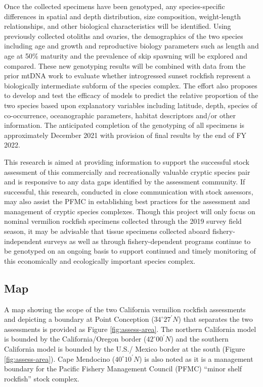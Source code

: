 \documentclass[
  english,
  a4paper,
]{article}
\begin{document}
Once the collected specimens have been genotyped, any species-specific differences
in spatial and depth distribution, size composition, weight-length relationships,
and other biological characteristics will be identified. Using previously
collected otoliths and ovaries, the demographics of the two species including
age and growth and reproductive biology parameters such as length and age at
50\% maturity and the prevalence of skip spawning will be explored and compared.
These new genotyping results will be combined with data from the prior mtDNA
work to evaluate whether introgressed sunset rockfish represent a biologically
intermediate subform of the species complex. The effort also proposes to develop
and test the efficacy of models to predict the relative proportion of the two
species based upon explanatory variables including latitude, depth, species of
co-occurrence, oceanographic parameters, habitat descriptors and/or other
information. The anticipated completion of the genotyping of all specimens
is approximately December 2021 with provision of final results by the end of FY 2022.

This research is aimed at providing information to support the successful stock
assessment of this commercially and recreationally valuable cryptic species pair
and is responsive to any data gaps identified by the assessment community. If
successful, this research, conducted in close communication with stock assessors,
may also assist the PFMC in establishing best practices for the assessment and
management of cryptic species complexes. Though this project will only focus
on nominal vermilion rockfish specimens collected through the 2019 survey
field season, it may be advisable that tissue specimens collected aboard
fishery-independent surveys as well as through fishery-dependent programs
continue to be genotyped on an ongoing basis to support continued and timely
monitoring of this economically and ecologically important species complex.

\hypertarget{map}{%
\subsection{Map}\label{map}}

A map showing the scope of the two California vermilion rockfish assessments and depicting a
boundary
at Point Conception ($34^\circ 27^\prime N$) that separates the two assessments is provided as Figure \ref{fig:assess-area}. The northern California
model is bounded by the California/Oregon border ($42^\circ 00^\prime N$) and the southern California model is
bounded by the U.S./ Mexico border at the south (Figure \ref{fig:assess-area}).
Cape Mendocino ($40^\circ 10^\prime N$) is also noted as it is a management boundary for the
Pacific Fishery Management Council (PFMC) ``minor shelf rockfish'' stock complex.
\end{document}
